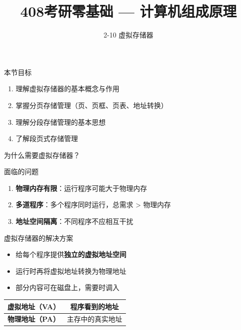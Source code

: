 \documentclass[10pt, aspectratio=169]{beamer}
\title{408考研零基础 --- 计算机组成原理}
\subtitle{2-10 虚拟存储器}
\author{}
\date{}
\begin{document}
\begin{frame}{本节目标}
    \begin{enumerate}
        \item 理解虚拟存储器的基本概念与作用
        \item 掌握分页存储管理（页、页框、页表、地址转换）
        \item 理解分段存储管理的基本思想
        \item 了解段页式存储管理
    \end{enumerate}
\end{frame}

\begin{frame}[t]{为什么需要虚拟存储器？}
    \begin{block}{面临的问题}
        \begin{enumerate}
            \item \textbf{物理内存有限}：运行程序可能大于物理内存
            \item \textbf{多道程序}：多个程序同时运行，总需求 > 物理内存
            \item \textbf{地址空间隔离}：不同程序不应相互干扰
        \end{enumerate}
    \end{block}
    \vspace{0.3em}
    \begin{block}{虚拟存储器的解决方案}
        \begin{itemize}
            \item 给每个程序提供\textbf{独立的虚拟地址空间}
            \item 运行时再将虚拟地址转换为物理地址
            \item 部分内容可在磁盘上，需要时调入
        \end{itemize}
    \end{block}
    \vspace{0.3em}
    \begin{center}
        \begin{tabular}{|c|c|}
            \hline
            \textbf{虚拟地址（VA）} & 程序看到的地址 \\
            \hline
            \textbf{物理地址（PA）} & 主存中的真实地址 \\
            \hline
        \end{tabular}
    \end{center}
\end{frame}
\end{document}
